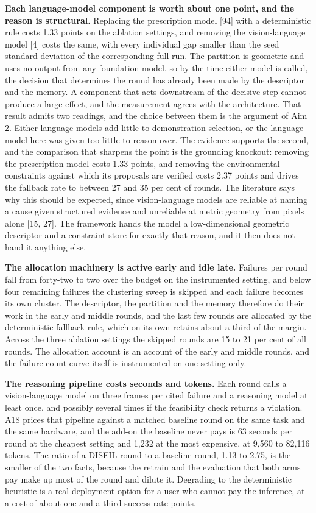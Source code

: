 \documentclass[
  11pt,
]{article}
\begin{document}
\textbf{Each language-model component is worth about one point, and the
reason is structural.} Replacing the prescription model {[}94{]} with a
deterministic rule costs 1.33 points on the ablation settings, and
removing the vision-language model {[}4{]} costs the same, with every
individual gap smaller than the seed standard deviation of the
corresponding full run. The partition is geometric and uses no output
from any foundation model, so by the time either model is called, the
decision that determines the round has already been made by the
descriptor and the memory. A component that acts downstream of the
decisive step cannot produce a large effect, and the measurement agrees
with the architecture. That result admits two readings, and the choice
between them is the argument of Aim 2. Either language models add little
to demonstration selection, or the language model here was given too
little to reason over. The evidence supports the second, and the
comparison that sharpens the point is the grounding knockout: removing
the prescription model costs 1.33 points, and removing the environmental
constraints against which its proposals are verified costs 2.37 points
and drives the fallback rate to between 27 and 35 per cent of rounds.
The literature says why this should be expected, since vision-language
models are reliable at naming a cause given structured evidence and
unreliable at metric geometry from pixels alone {[}15, 27{]}. The
framework hands the model a low-dimensional geometric descriptor and a
constraint store for exactly that reason, and it then does not hand it
anything else.

\textbf{The allocation machinery is active early and idle late.}
Failures per round fall from forty-two to two over the budget on the
instrumented setting, and below four remaining failures the clustering
sweep is skipped and each failure becomes its own cluster. The
descriptor, the partition and the memory therefore do their work in the
early and middle rounds, and the last few rounds are allocated by the
deterministic fallback rule, which on its own retains about a third of
the margin. Across the three ablation settings the skipped rounds are 15
to 21 per cent of all rounds. The allocation account is an account of
the early and middle rounds, and the failure-count curve itself is
instrumented on one setting only.

\textbf{The reasoning pipeline costs seconds and tokens.} Each round
calls a vision-language model on three frames per cited failure and a
reasoning model at least once, and possibly several times if the
feasibility check returns a violation. A18 prices that pipeline against
a matched baseline round on the same task and the same hardware, and the
add-on the baseline never pays is 63 seconds per round at the cheapest
setting and 1,232 at the most expensive, at 9,560 to 82,116 tokens. The
ratio of a DISEIL round to a baseline round, 1.13 to 2.75, is the
smaller of the two facts, because the retrain and the evaluation that
both arms pay make up most of the round and dilute it. Degrading to the
deterministic heuristic is a real deployment option for a user who
cannot pay the inference, at a cost of about one and a third
success-rate points.
\end{document}
